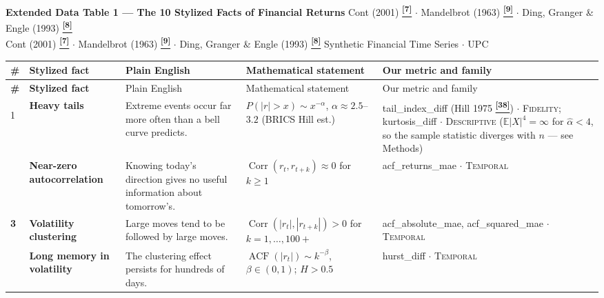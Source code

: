 \documentclass[10pt]{article}
\newcommand{\pagehead}[2]{%
  \begin{tcolorbox}[enhanced,arc=0pt,outer arc=0pt,boxrule=0pt,
    colback=Navy,colframe=Navy,
    top=5pt,bottom=5pt,left=8pt,right=8pt,
    before skip=0pt,after skip=10pt]
  {\color{white}\large\bfseries #1}%
  \ifx\relax#2\relax\else\\[1pt]{\color{blue!30!white}\small #2}\fi
  \hfill{\color{blue!20!white}\footnotesize Synthetic Financial Time Series $\cdot$ UPC}
  \end{tcolorbox}}
\newcommand{\tcite}[1]{%
  \hyperlink{R:#1}{\textsuperscript{\scriptsize\textbf{[#1]}}}}
\newcommand{\E}{\mathbb{E}}
\begin{document}
\clearpage


\pagehead{Extended Data Table 1 --- The 10 Stylized Facts of Financial Returns}
         {Cont (2001)\tcite{7} $\cdot$ Mandelbrot (1963)\tcite{9} $\cdot$ Ding, Granger \& Engle (1993)\tcite{8}}

\vspace{2pt}
\small
\setlength{\tabcolsep}{5pt}
\renewcommand{\arraystretch}{1.4}
\begin{longtable}{%
  >{\bfseries\centering}p{}
  >{\bfseries}p{}
  p{}
  p{}
  p{}}

\rowcolor{Navy}
{\color{white}\#} &
{\color{white}Stylized fact} &
{\color{white}Plain English} &
{\color{white}Mathematical statement} &
{\color{white}Our metric and family} \\[2pt]
\endfirsthead
\rowcolor{Navy}
{\color{white}\#} &
{\color{white}Stylized fact} &
{\color{white}Plain English} &
{\color{white}Mathematical statement} &
{\color{white}Our metric and family} \\[2pt]
\endhead

\rowcolor{TabOdd}
1 & Heavy tails &
  Extreme events occur far more often than a bell curve predicts. &
  $P(|r|>x) \sim x^{-\alpha}$, $\alpha \approx 2.5$--$3.2$ (BRICS Hill est.) &
  tail\_index\_diff (Hill 1975\tcite{38}) $\cdot$ \textsc{Fidelity}; kurtosis\_diff $\cdot$ \textsc{Descriptive} ($\E|X|^4=\infty$ for $\hat{\alpha}<4$, so the sample statistic diverges with $n$ --- see Methods) \\

2 & Near-zero autocorrelation &
  Knowing today's direction gives no useful information about tomorrow's. &
  $\operatorname{Corr}(r_t, r_{t+k}) \approx 0$ for $k \geq 1$ &
  acf\_returns\_mae $\cdot$ \textsc{Temporal} \\

\rowcolor{TabOdd}
3 & Volatility clustering &
  Large moves tend to be followed by large moves. &
  $\operatorname{Corr}(|r_t|, |r_{t+k}|) > 0$ for $k = 1, \ldots, 100{+}$ &
  acf\_absolute\_mae, acf\_squared\_mae $\cdot$ \textsc{Temporal} \\

4 & Long memory in volatility &
  The clustering effect persists for hundreds of days. &
  $\operatorname{ACF}(|r_t|) \sim k^{-\beta}$, $\beta \in (0,1)$; $H > 0.5$ &
  hurst\_diff $\cdot$ \textsc{Temporal} \\


\end{longtable}
\end{document}

